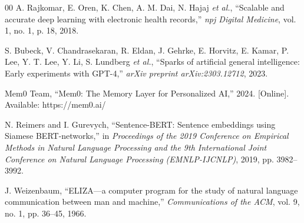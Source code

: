 \documentclass[12pt]{article}
\begin{document}
\begin{thebibliography}{00}
A. Rajkomar, E. Oren, K. Chen, A. M. Dai, N. Hajaj \emph{et al.}, ``Scalable and accurate deep learning with electronic health records,'' \textit{npj Digital Medicine}, vol. 1, no. 1, p. 18, 2018.

S. Bubeck, V. Chandrasekaran, R. Eldan, J. Gehrke, E. Horvitz, E. Kamar, P. Lee, Y. T. Lee, Y. Li, S. Lundberg \emph{et al.}, ``Sparks of artificial general intelligence: Early experiments with GPT-4,'' \textit{arXiv preprint arXiv:2303.12712}, 2023.

Mem0 Team, ``Mem0: The Memory Layer for Personalized AI,'' 2024. [Online]. Available: https://mem0.ai/

N. Reimers and I. Gurevych, ``Sentence-BERT: Sentence embeddings using Siamese BERT-networks,'' in \textit{Proceedings of the 2019 Conference on Empirical Methods in Natural Language Processing and the 9th International Joint Conference on Natural Language Processing (EMNLP-IJCNLP)}, 2019, pp. 3982--3992.

J. Weizenbaum, ``ELIZA—a computer program for the study of natural language communication between man and machine,'' \textit{Communications of the ACM}, vol. 9, no. 1, pp. 36--45, 1966.

\end{thebibliography}
\end{document}
